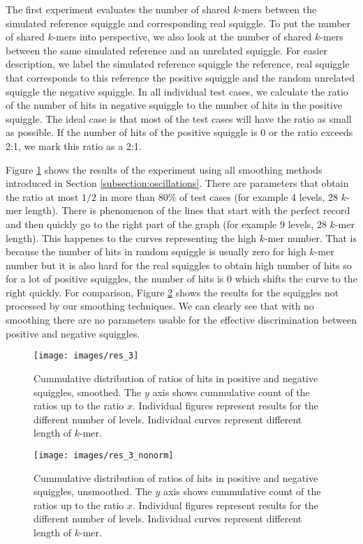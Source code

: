 The first experiment evaluates the number of shared $k$-mers between the simulated
reference squiggle and corresponding real squiggle. To put the number of shared
$k$-mers into perspective, we also look at the number of shared $k$-mers between the
same simulated reference and an unrelated squiggle. For easier description, we
label the simulated reference squiggle the reference, real squiggle that corresponds
to this reference the positive squiggle and the random unrelated squiggle the negative squiggle.
In all individual test cases, we calculate the ratio of the number of hits in negative squiggle
to the number of hits in the positive squiggle.
The ideal case is that most of the test cases will have the ratio as small as possible.
If the number of hits of the positive squiggle is $0$ or the ratio exceeds 2:1, we mark this ratio as a 2:1.

Figure \ref{obr:res_3} shows the results of the experiment using all smoothing
methods introduced in Section \ref{subsection:oscillations}.
There are parameters that obtain the ratio at most $1/2$ in more than 80\% of test cases
(for example 4 levels, 28 $k$-mer length). 
There is phenomenon of the lines that start with the perfect record and then quickly
go to the right part of the graph (for example 9 levels, 28 $k$-mer length). This happenes to the curves representing
the high $k$-mer number. That is because the number of hits in random squiggle is usually zero
for high $k$-mer number but it is also hard for the real squiggles to obtain
high number of hits so for a lot of positive squiggles, the number of hits is 0 which
shifts the curve to the right quickly. For comparison, Figure \ref{obr:res_3_nonorm} shows the results
for the squiggles not processed by our smoothing techniques. We can clearly see that
with no smoothing there are no parameters usable for the effective discrimination
between positive and negative squiggles.

\begin{figure}
\centerline{\texttt{[image: images/res\_3]}}
\caption[TODO]{Cummulative distribution of ratios of hits in positive and negative
squiggles, smoothed. The $y$ axis shows cummulative count of the ratios up to the ratio $x$. Individual figures represent
results for the different number of levels. Individual curves represent different
length of $k$-mer.}
\label{obr:res_3}
\end{figure}

\begin{figure}
\centerline{\texttt{[image: images/res\_3\_nonorm]}}
\caption[TODO]{Cummulative distribution of ratios of hits in positive and negative
squiggles, unsmoothed. The $y$ axis shows cummulative count of the ratios up to the ratio $x$. Individual figures represent
results for the different number of levels. Individual curves represent different
length of $k$-mer.}
\label{obr:res_3_nonorm}
\end{figure}

